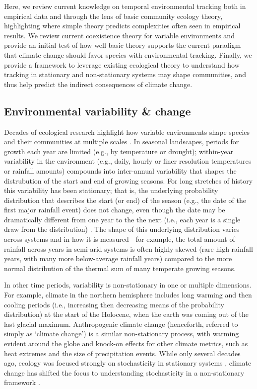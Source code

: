 \documentclass[11pt,letterpaper]{article}
\begin{document}
Here, we review current knowledge on temporal environmental tracking both in empirical data and through the lens of basic community ecology theory, highlighting where simple theory predicts complexities often seen in empirical results. We review current coexistence theory for variable environments and provide an initial test of how well basic theory supports the current paradigm that climate change should favor species with environmental tracking. Finally, we provide a framework to leverage existing ecological theory to understand how tracking in stationary and non-stationary systems may shape communities, and thus help predict the indirect consequences of climate change. 

\subsection{Environmental variability \& change}

Decades of ecological research highlight how variable environments shape species and their communities at multiple scales \citep{Sale:1977oq,Chesson:1997dz}.  In seasonal landscapes, periods for growth each year are limited (e.g., by temperature or drought); within-year variability in the environment (e.g., daily, hourly or finer resolution temperatures or rainfall amounts) compounds into inter-annual variability that shapes the distrubution of the start and end of growing seasons. For long stretches of history this variability has been stationary; that is, the underlying probability distribution that describes the start (or end) of the season (e.g., the date of the first major rainfall event) does not change, even though the date may be dramatically different from one year to the the next (i.e., each year is a single draw from the distribution) . The shape of this underlying distribution varies across systems and in how it is measured---for example, the total amount of rainfall across years in semi-arid systems is often highly skewed (rare high rainfall years, with many more below-average rainfall years) compared to the more normal distribution of the thermal sum of many temperate growing seasons. 

In other time periods, variability is non-stationary in one or multiple dimensions. For example, climate in the northern hemisphere includes long warming and then cooling periods (i.e., increasing then decreasing means of the probability distribution) at the start of the Holocene, when the earth was coming out of the last glacial maximum. Anthropogenic climate change (henceforth, referred to simply as `climate change') is a similar non-stationary process, with warming evident around the globe and knock-on effects for other climate metrics, such as heat extremes and the size of precipitation events. While only several decades ago, ecology was focused strongly on stochasticity in stationary systems \citep[e.g.,][]{Ripa1996,Kaitala1997}, climate change has shifted the focus to understanding stochasticity in a non-stationary framework \citep[e.g.,][]{cazwavelets,ehrlen2016}.
\end{document}
